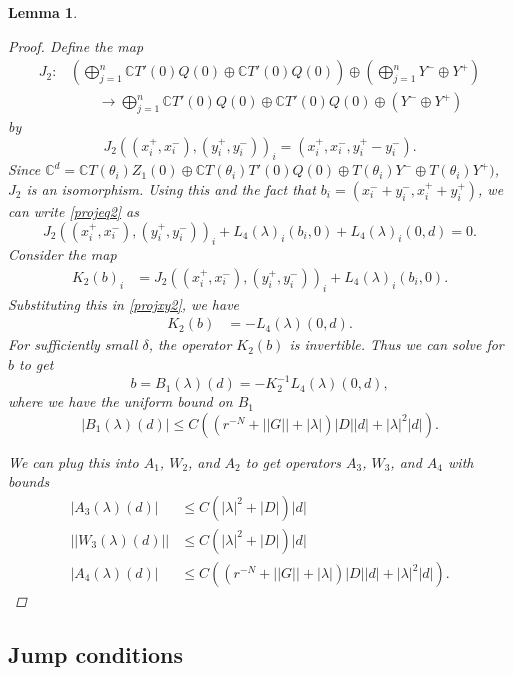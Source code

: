 \documentclass[12pt]{elsarticle}
\def\C{{\mathbb C}}
\newtheorem{lemma}{Lemma}
\begin{document}
\begin{lemma}
\begin{proof}
Define the map
\begin{align*}
J_2: &\left( \bigoplus_{j=1}^n \C T'(0)Q(0) \oplus \C T'(0)Q(0) \right) \oplus
\left( \bigoplus_{j=1}^n Y^- \oplus Y^+ \right)  \\
&\qquad\rightarrow \bigoplus_{j=1}^n \C T'(0)Q(0) \oplus \C T'(0)Q(0) \oplus (Y^- \oplus Y^+)
\end{align*}
by 
\[
J_2( (x_i^+, x_i^-),(y_i^+, y_i^-))_i = ( x_i^+, x_i^-, y_i^+ - y_i^- ).
\]
Since $\C^d = \C T(\theta_i) Z_1(0) \oplus \C T(\theta_i) T'(0)Q(0) \oplus T(\theta_i) Y^- \oplus T(\theta_i) Y^+)$, $J_2$ is an isomorphism. Using this and the fact that $b_i = (x_i^- + y_i^-, x_i^+ + y_i^+)$, we can write \cref{projeq2} as
\begin{equation}\label{projxy2}
J_2( (x_i^+, x_i^-),(y_i^+, y_i^-))_i 
+ L_4(\lambda)_i(b_i, 0) + L_4(\lambda)_i(0, d) = 0.
\end{equation}
Consider the map
\begin{align*}
K_2(b)_i &= J_2( (x_i^+, x_i^-),(y_i^+, y_i^-))_i 
+ L_4(\lambda)_i(b_i, 0). 
\end{align*}
Substituting this in \cref{projxy2}, we have
\begin{align*}
K_2(b) &= -L_4(\lambda)(0, d).
\end{align*}
For sufficiently small $\delta$, the operator $K_2(b)$ is invertible. Thus we can solve for $b$ to get
\begin{equation}
b = B_1(\lambda)(d) = -K_2^{-1} L_4(\lambda)(0, d),
\end{equation}
where we have the uniform bound on $B_1$
\begin{equation}
|B_1(\lambda)(d)| \leq C \left( (r^{-N} + ||G|| + |\lambda|)|D| |d| + |\lambda|^2 |d| \right) .
\end{equation}

We can plug this into $A_1$, $W_2$, and $A_2$ to get operators $A_3$, $W_3$, and $A_4$ with bounds
\begin{align*}
|A_3(\lambda)(d)| &\leq C \left(|\lambda|^2 + |D|\right)|d|\\
||W_3(\lambda)(d)|| &\leq C \left(|\lambda|^2 + |D|\right)|d| \\
|A_4(\lambda)(d)| &\leq 
C\left( (r^{-N} + ||G|| + |\lambda|)|D||d| + |\lambda|^2 |d|  \right).
\end{align*}
\end{proof}
\end{lemma}

\subsection{Jump conditions}
\end{document}
